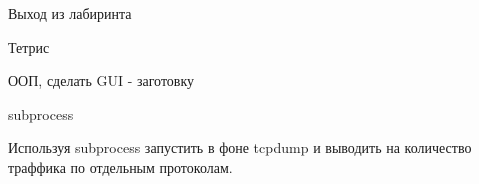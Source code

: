\documentclass{article}
\begin{document}
\begin{center} Выход из лабиринта \end{center}

\newpage

\begin{center} Тетрис \end{center}
ООП, сделать GUI - заготовку
\newpage

\begin{center} subprocess \end{center}
Используя subprocess запустить в фоне tcpdump и выводить на количество траффика
по отдельным протоколам.
\newpage

\end{document}
